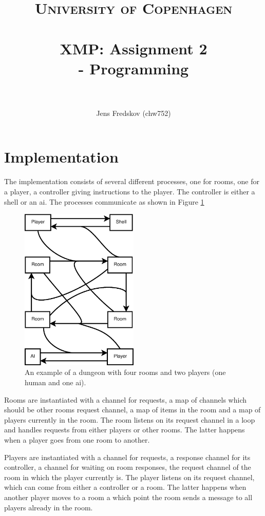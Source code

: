 \documentclass[a4paper, 11pt]{article}
\title{ 
\normalfont \normalsize 
\textsc{University of Copenhagen} \\ [25pt]
\horrule{0.5pt} \\[0.4cm]
\huge XMP: Assignment 2 \\ \Large - Programming \\
\horrule{2pt} \\[0.5cm]
}
\author{Jens Fredskov (chw752)}
\begin{document}
\maketitle
\pagebreak

\section{Implementation} %
\label{sec:implementation}

The implementation consists of several different processes, one for rooms, one for a player, a controller giving instructions to the player. The controller is either a shell or an ai. The processes communicate as shown in Figure \ref{fig:communication}

\begin{figure}[H]
    \centering
   \includegraphics[width=0.5\textwidth]{communication.eps}
   \caption{An example of a dungeon with four rooms and two players (one human and one ai).}
\label{fig:communication}
\end{figure}

Rooms are instantiated with a channel for requests, a map of channels which should be other rooms request channel, a map of items in the room and a map of players currently in the room. The room listens on its request channel in a loop and handles requests from either players or other rooms. The latter happens when a player goes from one room to another.

Players are instantiated with a channel for requests, a response channel for its controller, a channel for waiting on room responses, the request channel of the room in which the player currently is. The player listens on its request channel, which can come from either a controller or a room. The latter happens when another player moves to a room a which point the room sends a message to all players already in the room.
\end{document}
